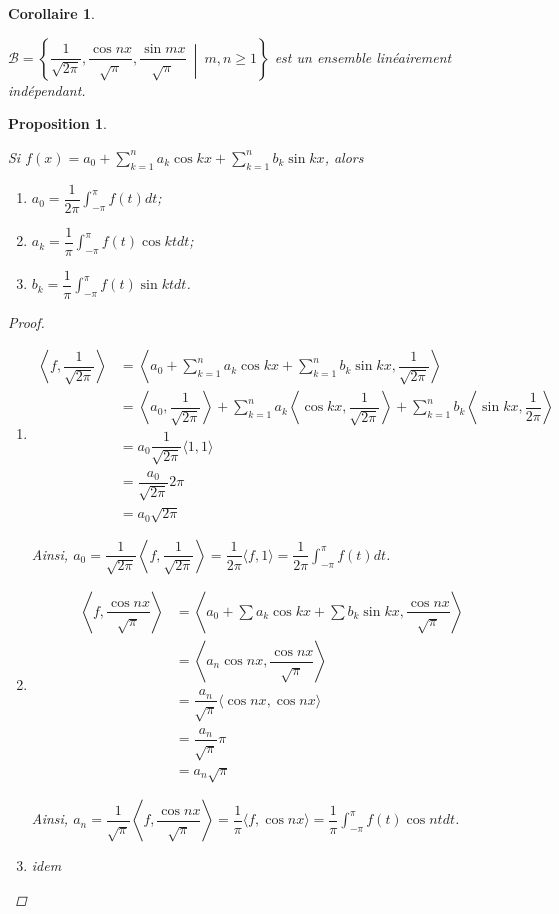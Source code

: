 \documentclass{report}
\newcommand*{\dsum}[4]{\displaystyle\sum_{#1=#2}^{#3}#4}
\newcommand*{\dint}[3]{\displaystyle\int_{#1}^{#2}#3}
\newcommand*{\gte}{\geqslant}
\newtheorem*{prop}{Proposition}
\newtheorem*{coro}{Corollaire}
\theoremstyle{definition}
\theoremstyle{remark}
\begin{document}
	\begin{coro}~

		$\mathcal{B} = \left\{ \dfrac{1}{\sqrt{2\pi}}, \dfrac{\cos nx}{\sqrt{\pi}}, \dfrac{\sin mx}{\sqrt{\pi}} ~\middle|~ m,n \gte 1 \right\}$ est un ensemble lin\'eairement ind\'ependant.
	\end{coro}
	\begin{prop}~

		Si $f(x) = a_0 + \dsum{k}{1}{n}{a_k\cos kx} + \dsum{k}{1}{n}{b_k\sin kx}$, alors
		\begin{enumerate}[label=\roman*)]
			\item $a_0 = \dfrac{1}{2\pi} \dint{-\pi}{\pi}{f(t) dt}$;
			\item $a_k = \dfrac{1}{\pi} \dint{-\pi}{\pi}{f(t)\cos kt dt}$;
			\item $b_k = \dfrac{1}{\pi} \dint{-\pi}{\pi}{f(t)\sin kt dt}$.
		\end{enumerate}
		\begin{proof}~

			\begin{enumerate}[label=\roman*)]
				\item
				\begin{align*}
					\left\langle f, \dfrac{1}{\sqrt{2\pi}} \right\rangle&= \left\langle a_0 + \dsum{k}{1}{n}{a_k \cos kx} + \dsum{k}{1}{n}{b_k \sin kx}, \dfrac{1}{\sqrt{2\pi}} \right\rangle\\
					&= \left\langle a_0, \dfrac{1}{\sqrt{2\pi}} \right\rangle + \dsum{k}{1}{n}{a_k \left\langle \cos kx, \dfrac{1}{\sqrt{2\pi}} \right\rangle} + \dsum{k}{1}{n}{b_k \left\langle \sin kx, \dfrac{1}{2\pi} \right\rangle}\\
					&= a_0 \dfrac{1}{\sqrt{2\pi}} \langle 1,1 \rangle\\
					&= \dfrac{a_0}{\sqrt{2\pi}} 2\pi\\
					&= a_0\sqrt{2\pi}
				\end{align*}

				Ainsi, $a_0 = \dfrac{1}{\sqrt{2\pi}} \left\langle f, \dfrac{1}{\sqrt{2\pi}} \right\rangle = \dfrac{1}{2\pi} \langle f,1 \rangle = \dfrac{1}{2\pi} \dint{-\pi}{\pi}{f(t) dt}$.
				\item
				\begin{align*}
					\left\langle f, \dfrac{\cos nx}{\sqrt{\pi}} \right\rangle&= \left\langle a_0 + \sum{a_k \cos kx} + \sum{b_k \sin kx}, \dfrac{\cos nx}{\sqrt{\pi}} \right\rangle\\
					&= \left\langle a_n \cos nx, \dfrac{\cos nx}{\sqrt{\pi}} \right\rangle\\
					&= \dfrac{a_n}{\sqrt{\pi}} \langle \cos nx, \cos nx \rangle\\
					&= \dfrac{a_n}{\sqrt{\pi}}\pi\\
					&= a_n\sqrt{\pi}
				\end{align*}

				Ainsi, $a_n = \dfrac{1}{\sqrt{\pi}} \left\langle f, \dfrac{\cos nx}{\sqrt{\pi}} \right\rangle = \dfrac{1}{\pi} \langle f,\cos nx \rangle = \dfrac{1}{\pi} \dint{-\pi}{\pi}{f(t) \cos nt dt}$.
				\item idem%
			\end{enumerate}
		\end{proof}
	\end{prop}
\end{document}
